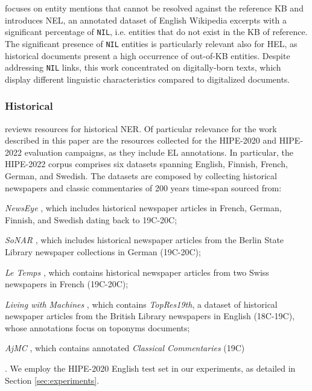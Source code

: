 \citet{zhu-etal-2023-learn} focuses on entity mentions that cannot be resolved against the reference KB and introduces NEL, an annotated dataset of English Wikipedia excerpts with a significant percentage of \texttt{NIL}, i.e. entities that do not exist in the KB of reference. The significant presence of \texttt{NIL} entities is particularly relevant also for HEL, as historical documents present a high occurrence of out-of-KB entities. Despite addressing \texttt{NIL} links, this work concentrated on digitally-born texts, which display different linguistic characteristics compared to digitalized documents.

\subsubsection*{Historical}
\citet{ehrmannNamedEntityRecognition2023} reviews resources for historical NER. Of particular relevance for the work described in this paper are the resources collected for the HIPE-2020 \citep{HIPE2020Overview,HIPE2020ExtOverview} and HIPE-2022 \citep{HIPE2022Overview} evaluation campaigns, as they include EL annotations.
In particular, the HIPE-2022 corpus comprises six datasets spanning English, Finnish, French, German, and Swedish. The datasets are composed by collecting historical newspapers and classic commentaries of 200 years time-span %
sourced from:
\begin{enumerate*}[label=(\roman*)]
    \item \emph{NewsEye} \citep{Hamdi2021}, which includes historical newspaper articles in French, German, Finnish, and Swedish dating back to 19C-20C;
    \item \emph{SoNAR} \citep{Sonar2021}, which includes historical newspaper articles from the Berlin State Library newspaper collections in German (19C-20C);
    \item \emph{Le Temps} \citep{ehrmann2016diachronic}, which contains historical newspaper articles from two Swiss newspapers in French (19C-20C);
    \item \emph{Living with Machines} \citep{ehrmann2016diachronic}, which contains \textit{TopRes19th}, a dataset of historical newspaper articles from the British Library newspapers in English (18C-19C), whose annotations focus on toponyms documents;
    \item \emph{AjMC}%
    , which contains annotated \textit{Classical Commentaries} (19C)
\end{enumerate*}.
We employ the HIPE-2020 English test set in our experiments, as detailed in Section \ref{sec:experiments}.

